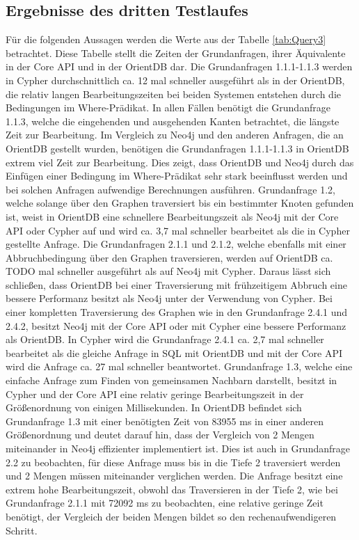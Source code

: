 \subsection{Ergebnisse des dritten Testlaufes}
Für die folgenden Aussagen werden die Werte aus der Tabelle \ref{tab:Query3}  betrachtet. Diese Tabelle stellt die Zeiten der Grundanfragen, ihrer Äquivalente in der Core API und in der OrientDB dar. \newline
Die Grundanfragen 1.1.1-1.1.3 werden in Cypher durchschnittlich ca. 12 mal schneller ausgeführt als in der OrientDB, die relativ langen Bearbeitungszeiten bei beiden Systemen entstehen durch die Bedingungen im Where-Prädikat. In allen Fällen benötigt die Grundanfrage 1.1.3, welche die eingehenden und ausgehenden Kanten betrachtet, die längste Zeit zur Bearbeitung. Im Vergleich zu Neo4j und den anderen Anfragen, die an OrientDB gestellt wurden, benötigen die Grundanfragen 1.1.1-1.1.3 in OrientDB extrem viel Zeit zur Bearbeitung. Dies zeigt, dass OrientDB und Neo4j durch das Einfügen einer Bedingung im Where-Prädikat sehr stark beeinflusst werden und bei solchen Anfragen aufwendige Berechnungen ausführen. \newline
 Grundanfrage 1.2, welche solange über den Graphen traversiert bis ein bestimmter Knoten gefunden ist, weist in OrientDB eine schnellere Bearbeitungszeit als Neo4j mit der Core API oder Cypher auf und wird ca. 3,7 mal schneller bearbeitet als die in Cypher gestellte Anfrage. Die Grundanfragen 2.1.1 und 2.1.2, welche ebenfalls mit einer Abbruchbedingung über den Graphen traversieren, werden auf OrientDB ca. {\color{red}  TODO} mal schneller ausgeführt als auf Neo4j mit Cypher. Daraus lässt sich schließen, dass OrientDB  bei einer Traversierung mit frühzeitigem Abbruch eine bessere Performanz besitzt als Neo4j unter der Verwendung von Cypher. Bei einer kompletten Traversierung des Graphen wie in den Grundanfrage 2.4.1 und 2.4.2, besitzt Neo4j mit der Core API oder mit Cypher eine bessere Performanz als OrientDB. In Cypher wird die Grundanfrage 2.4.1 ca. 2,7 mal schneller bearbeitet als die gleiche Anfrage in SQL mit OrientDB und mit der Core API wird die Anfrage ca. 27 mal schneller beantwortet. \newline
Grundanfrage 1.3, welche eine einfache Anfrage zum Finden von gemeinsamen Nachbarn darstellt, besitzt in Cypher und der Core API eine relativ geringe Bearbeitungszeit in der Größenordnung von einigen Millisekunden. In OrientDB befindet sich Grundanfrage 1.3 mit einer benötigten Zeit von 83955 ms in einer anderen Größenordnung und deutet darauf hin, dass der Vergleich von 2 Mengen miteinander in Neo4j effizienter implementiert ist. Dies ist auch in Grundanfrage 2.2 zu beobachten, für diese Anfrage muss bis in die Tiefe 2 traversiert werden und 2 Mengen müssen miteinander verglichen werden. Die Anfrage besitzt eine extrem hohe Bearbeitungszeit, obwohl das Traversieren in der Tiefe 2, wie bei Grundanfrage 2.1.1 mit 72092 ms zu beobachten, eine relative geringe Zeit benötigt, der Vergleich der beiden Mengen bildet so den rechenaufwendigeren Schritt. \newline

